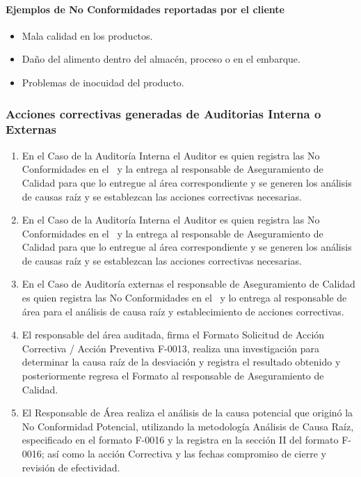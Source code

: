 \paragraph*{Ejemplos de No Conformidades reportadas por el cliente}
	\begin{itemize}
		\item Mala calidad en los productos.
		\item Daño del alimento dentro del almacén, proceso o en el embarque.
		\item Problemas de inocuidad del producto.
	\end{itemize}


\subsubsection{Acciones correctivas generadas de Auditorias Interna o Externas}
\begin{enumerate}
	\item En el Caso de la Auditoría Interna el Auditor es quien registra las No Conformidades en el \RAC~y la entrega al responsable de Aseguramiento de Calidad para que lo entregue al área correspondiente y se generen los análisis de causas raíz y se establezcan las acciones correctivas necesarias.
	\item En el Caso de la Auditoría Interna el Auditor es quien registra las No Conformidades en el \RAC~y la entrega al responsable de Aseguramiento de Calidad para que lo entregue al área correspondiente y se generen los análisis de causas raíz y se establezcan las acciones correctivas necesarias.
	\item En el Caso de Auditoría externas el responsable de Aseguramiento de Calidad es quien registra las No Conformidades en el \RAC~y lo entrega al responsable de área para el análisis de causa raíz y establecimiento de acciones correctivas.
	\item El responsable del área auditada, firma el Formato Solicitud de Acción Correctiva / Acción Preventiva F-0013, realiza una investigación para determinar la causa raíz de la desviación y registra el resultado obtenido y posteriormente regresa el Formato al responsable de Aseguramiento de Calidad.
	\item El Responsable de Área realiza el análisis de la causa potencial que originó la No Conformidad Potencial, utilizando la metodología Análisis de Causa Raíz, especificado en el formato F-0016 y la registra en la sección II del formato F-0016; así como la acción Correctiva y las fechas compromiso de cierre y revisión de efectividad.
\end{enumerate}

